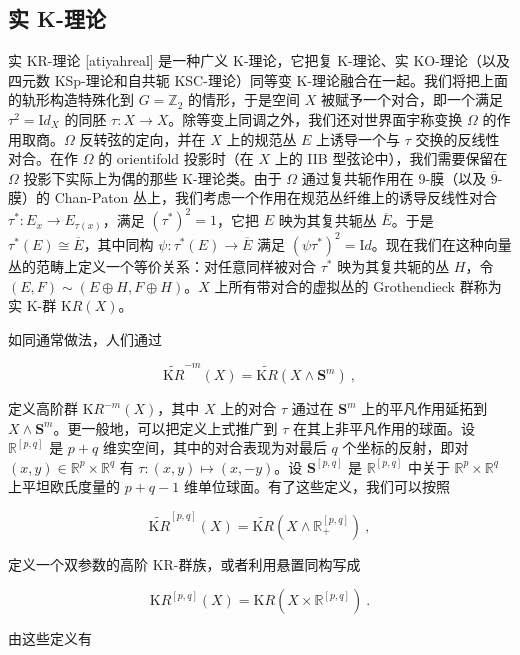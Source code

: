 \documentclass[11pt,a4paper]{ctexart}
\newcommand{\SrcRange}[2]{\marginpar{\raggedright\footnotesize 原文 p.#1}}
\begin{document}
\SrcRange{70}{70}
\subsection{实 K-理论}\label{ux5b9e-k-ux7406ux8bba}

实 KR-理论 [atiyahreal] 是一种广义 K-理论，它把复 K-理论、实 KO-理论（以及四元数 KSp-理论和自共轭 KSC-理论）同等变 K-理论融合在一起。我们将把上面的轨形构造特殊化到 \(G={\mathbb{Z}}_2\) 的情形，于是空间 \(X\) 被赋予一个对合，即一个满足 \(\tau^2={\mathrm Id}_{X}\) 的同胚 \(\tau: X\rightarrow X\)。除等变上同调之外，我们还对世界面宇称变换 \(\Omega\) 的作用取商。\(\Omega\) 反转弦的定向，并在 \(X\) 上的规范丛 \(E\) 上诱导一个与 \(\tau\) 交换的反线性对合。在作 \(\Omega\) 的 orientifold 投影时（在 \(X\) 上的 IIB 型弦论中），我们需要保留在 \(\Omega\) 投影下实际上为偶的那些 K-理论类。由于 \(\Omega\) 通过复共轭作用在 9-膜（以及 \(\overline{9}\)-膜）的 Chan-Paton 丛上，我们考虑一个作用在规范丛纤维上的诱导反线性对合 \(\tau^*:E_x\rightarrow E_{\tau(x)}\)，满足 \((\tau^*)^2=1\)，它把 \(E\) 映为其复共轭丛 \(\overline{E}\)。于是 \(\tau^*(E)\cong \overline{E}\)，其中同构 \(\psi:\tau^*(E)\rightarrow \overline{E}\) 满足 \((\psi\tau^*)^2={\mathrm Id}\)。现在我们在这种向量丛的范畴上定义一个等价关系：对任意同样被对合 \(\tau^*\) 映为其复共轭的丛 \(H\)，令 \((E,F)\sim (E\oplus H,F\oplus H)\)。\(X\) 上所有带对合的虚拟丛的 Grothendieck 群称为实 K-群 \({\mathrm KR}(X)\)。

如同通常做法，人们通过

\[\widetilde{{\mathrm KR}}^{-m}(X)=\widetilde{{\mathrm KR}}(X\wedge {\mathbf S}^m)\ ,\]

定义高阶群 \({\mathrm KR}^{-m}(X)\)，其中 \(X\) 上的对合 \(\tau\) 通过在 \({\mathbf S}^m\) 上的平凡作用延拓到 \(X\wedge {\mathbf S}^m\)。更一般地，可以把定义上式推广到 \(\tau\) 在其上非平凡作用的球面。设 \({\mathbb{R}}^[p,q]\) 是 \(p+q\) 维实空间，其中的对合表现为对最后 \(q\) 个坐标的反射，即对 \((x,y)\in {\mathbb{R}}^p\times{\mathbb{R}}^q\) 有 \(\tau:(x,y)\mapsto (x,-y)\)。设 \({\mathbf S}^[p,q]\) 是 \({\mathbb{R}}^[p,q]\) 中关于 \({\mathbb{R}}^p\times{\mathbb{R}}^q\) 上平坦欧氏度量的 \(p+q-1\) 维单位球面。有了这些定义，我们可以按照

\[\widetilde{{\mathrm KR}}^[p,q](X)=\widetilde{{\mathrm KR}}(X\wedge{\mathbb{R}}_+^[p,q])\ ,\]

定义一个双参数的高阶 KR-群族，或者利用悬置同构写成

\[{\mathrm KR}^[p,q](X)={\mathrm KR}(X\times {\mathbb{R}}^[p,q])\ .\]

由这些定义有
\end{document}
